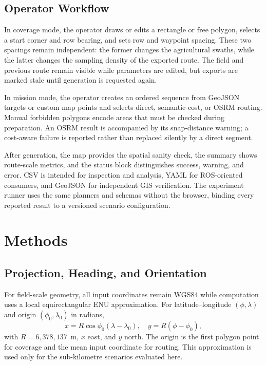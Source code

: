 \documentclass[conference,a4paper]{IEEEtran}
\begin{document}
\subsection{Operator Workflow}
In coverage mode, the operator draws or edits a rectangle or free polygon,
selects a start corner and row bearing, and sets row and waypoint spacing.
These two spacings remain independent: the former changes the agricultural
swaths, while the latter changes the sampling density of the exported route.
The field and previous route remain visible while parameters are edited, but
exports are marked stale until generation is requested again.

In mission mode, the operator creates an ordered sequence from GeoJSON targets
or custom map points and selects direct, semantic-cost, or OSRM routing. Manual
forbidden polygons encode areas that must be checked during preparation. An
OSRM result is accompanied by its snap-distance warning; a cost-aware failure
is reported rather than replaced silently by a direct segment.

After generation, the map provides the spatial sanity check, the summary shows
route-scale metrics, and the status block distinguishes success, warning, and
error. CSV is intended for inspection and analysis, YAML for ROS-oriented
consumers, and GeoJSON for independent GIS verification. The experiment runner
uses the same planners and schemas without the browser, binding every reported
result to a versioned scenario configuration.

\section{Methods}
\subsection{Projection, Heading, and Orientation}
For field-scale geometry, all input coordinates remain WGS84 while computation
uses a local equirectangular ENU approximation. For latitude--longitude
$(\phi,\lambda)$ and origin $(\phi_0,\lambda_0)$ in radians,
\begin{equation}
x=R\cos\phi_0(\lambda-\lambda_0),\quad y=R(\phi-\phi_0),
\end{equation}
with $R=6{,}378{,}137$~m, $x$ east, and $y$ north. The origin is the first
polygon point for coverage and the mean input coordinate for routing. This
approximation is used only for the sub-kilometre scenarios evaluated here.
\end{document}
